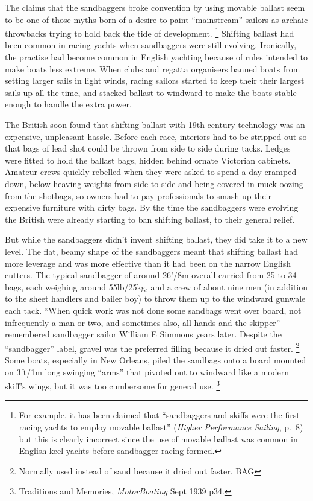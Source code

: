 \documentclass[
  letterpaper,
]{scrbook}
\begin{document}
The claims that the sandbaggers broke convention by using movable
ballast seem to be one of those myths born of a desire to paint
``mainstream'' sailors as archaic throwbacks trying to hold back the
tide of development. \footnote{For example, it has been claimed that
  ``sandbaggers and skiffs were the first racing yachts to employ
  movable ballast'' (\emph{Higher Performance Sailing}, p.~8) but this
  is clearly incorrect since the use of movable ballast was common in
  English keel yachts before sandbagger racing formed.} Shifting ballast
had been common in racing yachts when sandbaggers were still evolving.
Ironically, the practise had become common in English yachting because
of rules intended to make boats less extreme. When clubs and regatta
organisers banned boats from setting larger sails in light winds, racing
sailors started to keep their their largest sails up all the time, and
stacked ballast to windward to make the boats stable enough to handle
the extra power.

The British soon found that shifting ballast with 19th century
technology was an expensive, unpleasant hassle. Before each race,
interiors had to be stripped out so that bags of lead shot could be
thrown from side to side during tacks. Ledges were fitted to hold the
ballast bags, hidden behind ornate Victorian cabinets. Amateur crews
quickly rebelled when they were asked to spend a day cramped down, below
heaving weights from side to side and being covered in muck oozing from
the shotbags, so owners had to pay professionals to smash up their
expensive furniture with dirty bags. By the time the sandbaggers were
evolving the British were already starting to ban shifting ballast, to
their general relief.

But while the sandbaggers didn't invent shifting ballast, they did take
it to a new level. The flat, beamy shape of the sandbaggers meant that
shifting ballast had more leverage and was more effective than it had
been on the narrow English cutters. The typical sandbagger of around
26'/8m overall carried from 25 to 34 bags, each weighing around
55lb/25kg, and a crew of about nine men (in addition to the sheet
handlers and bailer boy) to throw them up to the windward gunwale each
tack. ``When quick work was not done some sandbags went over board, not
infrequently a man or two, and sometimes also, all hands and the
skipper'' remembered sandbagger sailor William E Simmons years later.
Despite the ``sandbagger'' label, gravel was the preferred filling
because it dried out faster. \footnote{Normally used instead of sand
  because it dried out faster. BAG} Some boats, especially in New
Orleans, piled the sandbags onto a board mounted on 3ft/1m long swinging
``arms'' that pivoted out to windward like a modern skiff's wings, but
it was too cumbersome for general use. \footnote{Traditions and
  Memories, \emph{MotorBoating} Sept 1939 p34.}
\end{document}

